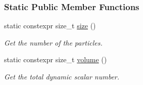 \subsubsection*{Static Public Member Functions}
\begin{DoxyCompactItemize}
\item 
static constexpr size\+\_\+t \mbox{\hyperlink{classregu_system_aceb0955bcd3e6ba7a6a1831953ac120b}{size}} ()
\begin{DoxyCompactList}\small\item\em Get the number of the particles. \end{DoxyCompactList}\item 
static constexpr size\+\_\+t \mbox{\hyperlink{classregu_system_a4260b237d36d137b01504c0effd385fa}{volume}} ()
\begin{DoxyCompactList}\small\item\em Get the total dynamic scalar number. \end{DoxyCompactList}\end{DoxyCompactItemize}
